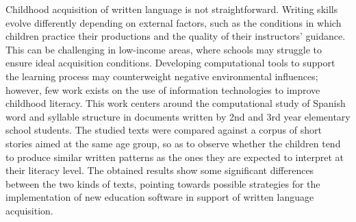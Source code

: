 Childhood acquisition of written language is not straightforward. Writing skills evolve differently depending on external factors, such as the conditions in which children practice their productions and the quality of their instructors' guidance. This can be challenging in low-income areas, where schools may struggle to ensure ideal acquisition conditions. Developing computational tools to support the learning process may counterweight negative environmental influences; however, few work exists on the use of information technologies to improve childhood literacy. This work centers around the computational study of Spanish word and syllable structure in documents written by 2nd and 3rd year elementary school students. The studied texts were compared against a corpus of short stories aimed at the same age group, so as to observe whether the children tend to produce similar written patterns as the ones they are expected to interpret at their literacy level. The obtained results show some significant differences between the two kinds of texts, pointing towards possible strategies for the implementation of new education software in support of written language acquisition.
